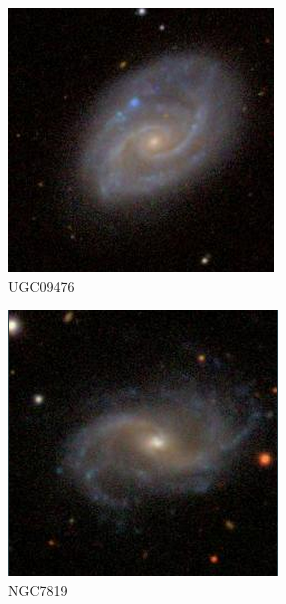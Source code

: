 \documentclass[9pt]{revtex4-1}
\begin{document}
\begin{figure}
\includegraphics[scale=0.3]{UGC09476.png}
\caption{UGC09476}
\end{figure}
\begin{figure}
\includegraphics[scale=0.3]{NGC7819.png}
\caption{NGC7819}
\end{figure}
\end{document}
